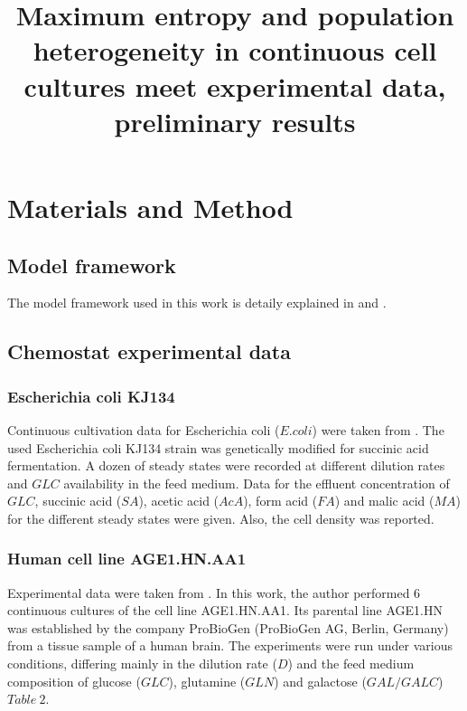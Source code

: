 \documentclass[]{article}
\title{Maximum entropy and population heterogeneity in 
	continuous cell cultures meet experimental data, preliminary results}
\author{}
\begin{document}
	
	\maketitle
	
	\section{Materials and Method}
	
	
	\subsection{Model framework }
	The model framework used in this work is detaily explained in  and .
	
	\subsection{Chemostat experimental data} 
	
	\subsubsection{Escherichia coli KJ134} 
	Continuous cultivation data for Escherichia coli ($E. coli$) were taken from . The used Escherichia coli KJ134 strain was genetically modified for succinic acid fermentation. A dozen of steady states were recorded at different dilution rates and $GLC$ availability in the feed medium. Data for the effluent concentration of $GLC$, succinic acid ($SA$), acetic acid ($AcA$), form acid ($FA$) and malic acid ($MA$) for the different steady states were given. Also, the cell density was reported.
	
	
	\subsubsection{Human cell line AGE1.HN.AA1} 
	Experimental data were taken from . In this work, the author performed 6 continuous cultures of the cell line AGE1.HN.AA1. Its parental line AGE1.HN was established by the company ProBioGen (ProBioGen AG, Berlin, Germany) from a tissue sample of a human brain. The experiments were run under various conditions, differing mainly in the dilution rate ($D$) and the feed medium composition of glucose ($GLC$), glutamine ($GLN$) and galactose ($GAL/GALC$) $Table\ 2$.
	
\end{document}
